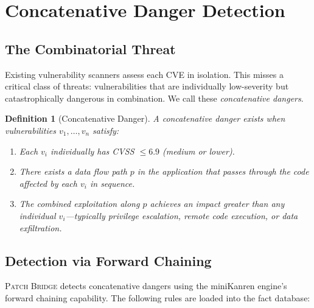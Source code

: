 \documentclass[11pt,twocolumn]{article}
\newtheorem{definition}[theorem]{Definition}
\begin{document}
\section{Concatenative Danger Detection}
\label{sec:concatenative}

\subsection{The Combinatorial Threat}

Existing vulnerability scanners assess each CVE in isolation. This
misses a critical class of threats: vulnerabilities that are
individually low-severity but catastrophically dangerous in
combination. We call these \emph{concatenative dangers}.

\begin{definition}[Concatenative Danger]
A \emph{concatenative danger} exists when vulnerabilities
$v_1, \ldots, v_n$ satisfy:
\begin{enumerate}[nosep]
  \item Each $v_i$ individually has CVSS $\leq 6.9$ (medium or lower).
  \item There exists a data flow path $p$ in the application that
    passes through the code affected by each $v_i$ in sequence.
  \item The combined exploitation along $p$ achieves an impact greater
    than any individual $v_i$---typically privilege escalation,
    remote code execution, or data exfiltration.
\end{enumerate}
\end{definition}

\subsection{Detection via Forward Chaining}

\textsc{Patch Bridge} detects concatenative dangers using the miniKanren
engine's forward chaining capability. The following rules are loaded
into the fact database:
\end{document}
